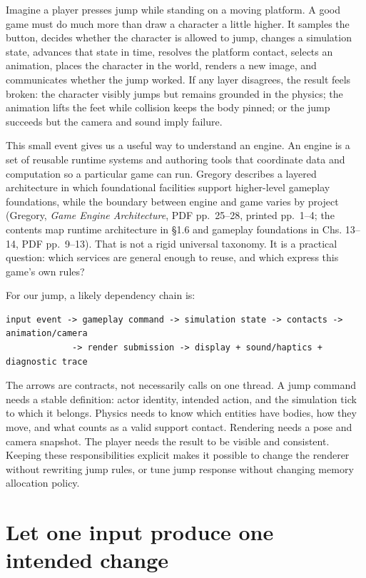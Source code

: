 Imagine a player presses jump while standing on a moving platform. A good game must do much more than draw a character a little higher. It samples the button, decides whether the character is allowed to jump, changes a simulation state, advances that state in time, resolves the platform contact, selects an animation, places the character in the world, renders a new image, and communicates whether the jump worked. If any layer disagrees, the result feels broken: the character visibly jumps but remains grounded in the physics; the animation lifts the feet while collision keeps the body pinned; or the jump succeeds but the camera and sound imply failure.

This small event gives us a useful way to understand an engine. An engine is a set of reusable runtime systems and authoring tools that coordinate data and computation so a particular game can run. Gregory describes a layered architecture in which foundational facilities support higher-level gameplay foundations, while the boundary between engine and game varies by project (Gregory, \emph{Game Engine Architecture}, PDF pp.~25--28, printed pp.~1--4; the contents map runtime architecture in §1.6 and gameplay foundations in Chs. 13--14, PDF pp.~9--13). That is not a rigid universal taxonomy. It is a practical question: which services are general enough to reuse, and which express this game's own rules?

For our jump, a likely dependency chain is:

\begin{verbatim}
input event -> gameplay command -> simulation state -> contacts -> animation/camera
             -> render submission -> display + sound/haptics + diagnostic trace
\end{verbatim}

The arrows are contracts, not necessarily calls on one thread. A jump command needs a stable definition: actor identity, intended action, and the simulation tick to which it belongs. Physics needs to know which entities have bodies, how they move, and what counts as a valid support contact. Rendering needs a pose and camera snapshot. The player needs the result to be visible and consistent. Keeping these responsibilities explicit makes it possible to change the renderer without rewriting jump rules, or tune jump response without changing memory allocation policy.

\section{Let one input produce one intended change}\label{05-engine-i-ch013-let-one-input-produce-one-intended-change}

